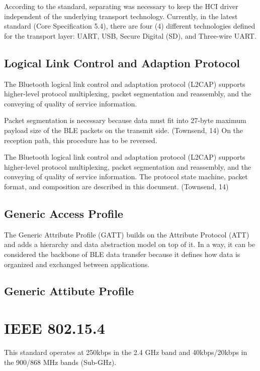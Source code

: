 According to the standard, separating was necessary to keep the HCI driver
independent of the underlying transport technology.
Currently, in the latest standard (Core Specification 5.4), there are four (4)
different technologies defined for the transport layer:
UART, USB, Secure Digital (SD), and Three-wire UART.

\subsection{Logical Link Control and Adaption Protocol}
The Bluetooth logical link control and adaptation protocol (L2CAP)
supports higher-level protocol multiplexing, packet segmentation and
reassembly, and the conveying of quality of service information. 

Packet segmentation is necessary because data must fit into 27-byte maximum
payload size of the BLE packets on the transmit side. (Townsend, 14)
On the reception path, this procedure has to be reversed.

The Bluetooth logical link control and adaptation protocol (L2CAP) supports
higher-level protocol multiplexing, packet segmentation and reassembly,
and the conveying of quality of service information.
The protocol state machine, packet format, and composition are described
in this document. (Townsend, 14)


\subsection{Generic Access Profile}
\label{ble:gap}
The Generic Attribute Profile (GATT) builds on the Attribute Protocol (ATT)
and adds a hierarchy and data abstraction model on top of it.
In a way, it can be considered the backbone of BLE data transfer because
it defines how data is organized and exchanged between applications.



\subsection{Generic Attibute Profile}
\label{ble:gatt}

\section{IEEE 802.15.4}
\label{sec:15_4}

This standard operates at 250kbps in the 2.4 GHz band and 40kbps/20kbps in the 900/868 MHz bands (Sub-GHz).

